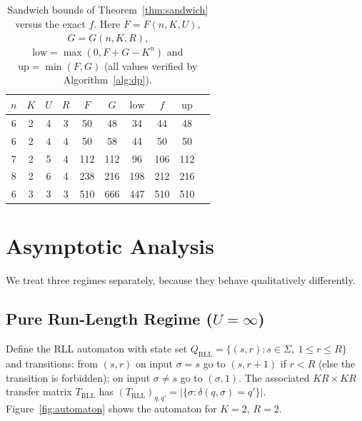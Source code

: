 \documentclass[a4paper,12pt]{article}
\begin{document}
\begin{table}[H]
\centering
\caption{Sandwich bounds of Theorem~\ref{thm:sandwich} versus the exact
$f$. Here $F=F(n,K,U)$, $G=G(n,K,R)$,
$\mathrm{low}=\max(0,F{+}G{-}K^n)$ and $\mathrm{up}=\min(F,G)$
(all values verified by Algorithm~\ref{alg:dp}).}
\label{tab:bounds}
\begin{tabular}{cccccccccc}
\toprule
$n$ & $K$ & $U$ & $R$ & $F$ & $G$ & $\mathrm{low}$ & $f$ & $\mathrm{up}$ \\
\midrule
6 & 2 & 4 & 3 & 50  & 48  & 34  & 44  & 48  \\
6 & 2 & 4 & 4 & 50  & 58  & 44  & 50  & 50  \\
7 & 2 & 5 & 4 & 112 & 112 & 96  & 106 & 112 \\
8 & 2 & 6 & 4 & 238 & 216 & 198 & 212 & 216 \\
6 & 3 & 3 & 3 & 510 & 666 & 447 & 510 & 510 \\
\bottomrule
\end{tabular}
\end{table}

\section{Asymptotic Analysis}
\label{sec:asymptotic}

We treat three regimes separately, because they behave qualitatively
differently.

\subsection{Pure Run-Length Regime ($U=\infty$)}

Define the RLL automaton with state set
$Q_{\mathrm{RLL}}=\{(s,r): s\in\Sigma,\ 1\le r\le R\}$ and transitions:
from $(s,r)$ on input $\sigma=s$ go to $(s,r{+}1)$ if $r<R$ (else the
transition is forbidden); on input $\sigma\ne s$ go to $(\sigma,1)$.
The associated $KR\times KR$ transfer matrix $T_{\mathrm{RLL}}$ has
$(T_{\mathrm{RLL}})_{q,q'}=|\{\sigma:\delta(q,\sigma)=q'\}|$.
Figure~\ref{fig:automaton} shows the automaton for $K=2$, $R=2$.
\end{document}
